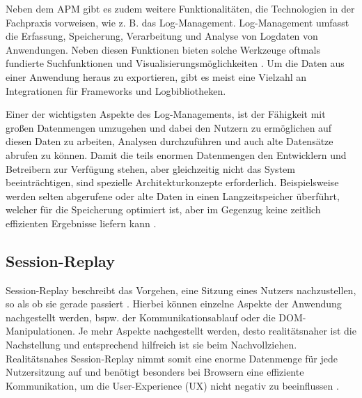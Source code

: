 Neben dem APM gibt es zudem weitere Funktionalitäten, die Technologien in der Fachpraxis vorweisen, wie z. B. das Log-Management. Log-Management umfasst die Erfassung, Speicherung, Verarbeitung und Analyse von Logdaten von Anwendungen. Neben diesen Funktionen bieten solche Werkzeuge oftmals fundierte Suchfunktionen und Visualisierungsmöglichkeiten \cite{DesignLogManagementSystem}. Um die Daten aus einer Anwendung heraus zu exportieren, gibt es meist eine Vielzahl an Integrationen für Frameworks und Logbibliotheken.

Einer der wichtigsten Aspekte des Log-Managements, ist der Fähigkeit mit großen Datenmengen umzugehen und dabei den Nutzern zu ermöglichen auf diesen Daten zu arbeiten, Analysen durchzuführen und auch alte Datensätze abrufen zu können\cite{LoggingAndLogManagement}. Damit die teils enormen Datenmengen den Entwicklern und Betreibern zur Verfügung stehen, aber gleichzeitig nicht das System beeinträchtigen, sind spezielle Architekturkonzepte erforderlich. Beispielsweise werden selten abgerufene oder alte Daten in einen Langzeitspeicher überführt, welcher für die Speicherung optimiert ist, aber im Gegenzug keine zeitlich effizienten Ergebnisse liefern kann \cite{LoggingAndLogManagement}.

\subsection{Session-Replay}

Session-Replay beschreibt das Vorgehen, eine Sitzung eines Nutzers nachzustellen, so als ob sie gerade passiert \cite{NoBoundariesExfiltrationBySessionReplayScripts}. Hierbei können einzelne Aspekte der Anwendung nachgestellt werden, bspw. der Kommunikationsablauf oder die DOM-Manipulationen. Je mehr Aspekte nachgestellt werden, desto realitätsnaher ist die Nachstellung und entsprechend hilfreich ist sie beim Nachvollziehen. Realitätsnahes Session-Replay nimmt somit eine enorme Datenmenge für jede Nutzersitzung auf und benötigt besonders bei Browsern eine effiziente Kommunikation, um die User-Experience (UX) nicht negativ zu beeinflussen \cite{AdvancedWebAnalyticsToolForMouseTracking} \cite{LogRocketPerformance}.

